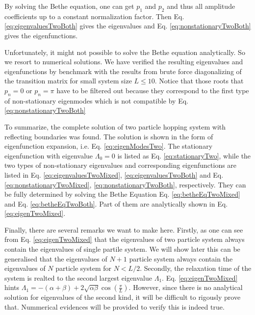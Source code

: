 By solving the Bethe equation, one can get $p_1$ and $p_2$ and thus all amplitude coefficients up to a constant normalization factor. Then Eq.  \eqref{eq:eigenvaluesTwoBoth} gives the eigenvalues and Eq.  \eqref{eq:nonstationaryTwoBoth} gives the eigenfunctions.

Unfortunately, it might not possible to solve the Bethe equation analytically.  So we resort to numerical solutions. We have verified the resulting eigenvalues and eigenfunctions by benchmark with the results from brute force diagonalizing of the transition matrix for small system size $L\le10$. Notice that those roots that $p_n=0$ or $p_n=\pi$ have to be filtered out because they correspond to the first type of non-stationary eigenmodes which is not compatible by Eq. \eqref{eq:nonstationaryTwoBoth}


To summarize, the complete solution of two particle hopping system with reflecting boundaries was found. The solution is shown in the form of eigenfunction expansion, i.e. Eq. \eqref{eq:eigenModesTwo}. The stationary eigenfunction with eigenvalue $\Lambda_0=0$ is listed as Eq.  \eqref{eq:stationaryTwo}, while the two types of non-stationary eigenvalues and corresponding eigenfunctions are listed in Eq. \eqref{eq:eigenvaluesTwoMixed}, \eqref{eq:eigenvaluesTwoBoth} and Eq.  \eqref{eq:nonstationaryTwoMixed}, \eqref{eq:nonstationaryTwoBoth}, respectively. They can be fully determined by  solving the Bethe Equation Eq. \eqref{eq:betheEqTwoMixed} and Eq. \eqref{eq:betheEqTwoBoth}. Part of them are analytically shown in Eq. \eqref{eq:eigenTwoMixed}.

Finally, there are several remarks we want to make here.  Firstly, as one can see from Eq.  \eqref{eq:eigenTwoMixed} that the eigenvalues of two particle system always contain the eigenvalues of single partile system. We will show later this can be generalised that the eigenvalues of $N+1$ particle system always contain the eigenvalues of $N$ particle system for $N<L/2$. Secondly, the relaxation time of the system is realted to the second largest eigenvalue $\Lambda_1$. Eq.  \eqref{eq:eigenTwoMixed} hints $\Lambda_1=-(\alpha+\beta)+2\sqrt{\alpha\beta} \cos\left(\frac{\pi}{L}\right)$.  However, since there is no analytical solution for eigenvalues of the second kind, it will be difficult to rigously prove that. Nummerical evidences will be provided to verify this is indeed true.

